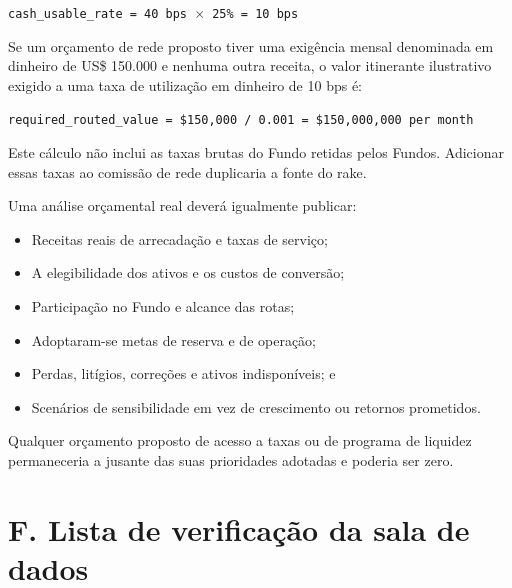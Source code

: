 \documentclass[11pt]{article}
\begin{document}
\texttt{cash\_usable\_rate = 40 bps $\times$ 25\% = 10 bps}

Se um orçamento de rede proposto tiver uma exigência mensal denominada em dinheiro de US\$ 150.000 e nenhuma outra receita, o valor itinerante ilustrativo exigido a uma taxa de utilização em dinheiro de 10 bps é:

\texttt{required\_routed\_value = \$150,000 / 0.001 = \$150,000,000 per month}

Este cálculo não inclui as taxas brutas do Fundo retidas pelos Fundos. Adicionar essas taxas ao comissão de rede duplicaria a fonte do rake.

Uma análise orçamental real deverá igualmente publicar:

\begin{itemize}[leftmargin=*]
\item Receitas reais de arrecadação e taxas de serviço;
\item A elegibilidade dos ativos e os custos de conversão;
\item Participação no Fundo e alcance das rotas;
\item Adoptaram-se metas de reserva e de operação;
\item Perdas, litígios, correções e ativos indisponíveis; e
\item Scenários de sensibilidade em vez de crescimento ou retornos prometidos.
\end{itemize}
Qualquer orçamento proposto de acesso a taxas ou de programa de liquidez permaneceria a jusante das suas prioridades adotadas e poderia ser zero.


\section*{F. Lista de verificação da sala de dados}
\end{document}
